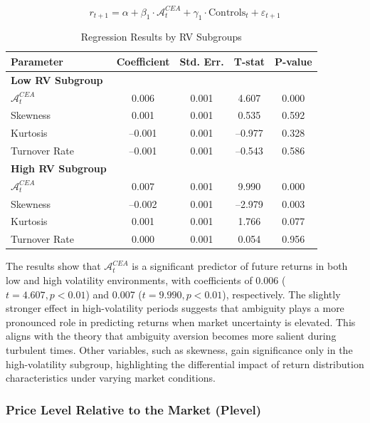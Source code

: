 \documentclass[preprint,12pt,authoryear]{elsarticle}
\begin{document}
\begin{equation}
r_{t+1} = \alpha + \beta_1 \cdot \mathcal{A}^{CEA}_t + \gamma_1 \cdot \mathrm{Controls}_t + \varepsilon_{t+1}
\end{equation}

\begin{table}[h!]
\centering
\caption{Regression Results by RV Subgroups}
\label{tab:rv_subgroup_results}
\begin{tabularx}{\textwidth}{Xcccc}
\toprule
\textbf{Parameter} & \textbf{Coefficient} & \textbf{Std. Err.} & \textbf{T-stat} & \textbf{P-value} \\
\midrule
\textbf{Low RV Subgroup} & & & & \\
\(\mathcal{A}^{CEA}_t\) & 0.006 & 0.001 & 4.607 & 0.000 \\
Skewness & 0.001 & 0.001 & 0.535 & 0.592 \\
Kurtosis & –0.001 & 0.001 & –0.977 & 0.328 \\
Turnover Rate & –0.001 & 0.001 & –0.543 & 0.586 \\
\midrule
\textbf{High RV Subgroup} & & & & \\
\(\mathcal{A}^{CEA}_t\) & 0.007 & 0.001 & 9.990 & 0.000 \\
Skewness & –0.002 & 0.001 & –2.979 & 0.003 \\
Kurtosis & 0.001 & 0.001 & 1.766 & 0.077 \\
Turnover Rate & 0.000 & 0.001 & 0.054 & 0.956 \\
\bottomrule
\end{tabularx}
\end{table}

The results show that $\mathcal{A}^{CEA}_t$ is a significant predictor of future returns in both low and high volatility environments, with coefficients of 0.006 ($t = 4.607, p < 0.01$) and 0.007 ($t = 9.990, p < 0.01$), respectively. The slightly stronger effect in high-volatility periods suggests that ambiguity plays a more pronounced role in predicting returns when market uncertainty is elevated. This aligns with the theory that ambiguity aversion becomes more salient during turbulent times. Other variables, such as skewness, gain significance only in the high-volatility subgroup, highlighting the differential impact of return distribution characteristics under varying market conditions.

\subsubsection{Price Level Relative to the Market (Plevel)} \label{subsec:price_level}
\end{document}
